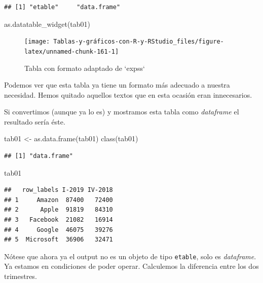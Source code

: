 \documentclass[
]{book}
\newenvironment{Shaded}{\begin{snugshade}}{\end{snugshade}}
\newcommand{\FunctionTok}[1]{\textcolor[rgb]{0.00,0.00,0.00}{#1}}
\newcommand{\NormalTok}[1]{#1}
\newcommand{\OtherTok}[1]{\textcolor[rgb]{0.56,0.35,0.01}{#1}}
\begin{document}
\begin{verbatim}
## [1] "etable"     "data.frame"
\end{verbatim}

\begin{Shaded}
\begin{Highlighting}[]
\FunctionTok{as.datatable\_widget}\NormalTok{(tab01)}
\end{Highlighting}
\end{Shaded}

\begin{figure}[H]

{\centering \texttt{[image: Tablas-y-gráficos-con-R-y-RStudio\_files/figure-latex/unnamed-chunk-161-1]} 

}

\caption{Tabla con formato adaptado de `expss`}\label{fig:unnamed-chunk-161}
\end{figure}

Podemos ver que esta tabla ya tiene un formato más adecuado a nuestra necesidad. Hemos quitado aquellos textos que en esta ocasión eran innecesarios.

Si convertimos (aunque ya lo es) y mostramos esta tabla como \emph{dataframe} el resultado sería éste.

\begin{Shaded}
\begin{Highlighting}[]
\NormalTok{tab01 }\OtherTok{\textless{}{-}} \FunctionTok{as.data.frame}\NormalTok{(tab01)}
\FunctionTok{class}\NormalTok{(tab01)}
\end{Highlighting}
\end{Shaded}

\begin{verbatim}
## [1] "data.frame"
\end{verbatim}

\begin{Shaded}
\begin{Highlighting}[]
\NormalTok{tab01}
\end{Highlighting}
\end{Shaded}

\begin{verbatim}
##   row_labels I-2019 IV-2018
## 1     Amazon  87400   72400
## 2      Apple  91819   84310
## 3   Facebook  21082   16914
## 4     Google  46075   39276
## 5  Microsoft  36906   32471
\end{verbatim}

Nótese que ahora ya el output no es un objeto de tipo \texttt{etable}, solo es \emph{dataframe}. Ya estamos en condiciones de poder operar. Calculemos la diferencia entre los dos trimestres.
\end{document}
